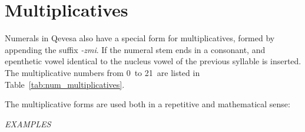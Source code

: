 \documentclass[grammar]{subfiles}
\begin{document}
  \section{Multiplicatives}
  \label{sec:num_multiplicatives}

  Numerals in Qevesa also have a special form for multiplicatives, formed by appending the suffix \textit{-zmi}. If the numeral stem ends in a consonant, and epenthetic vowel identical to the nucleus vowel of the previous syllable is inserted. The multiplicative numbers from 0\dec\ to 21\dec\ are listed in Table~\ref{tab:num_multiplicatives}.

  \begin{table}[htpb]\small\capstart
      \qquad
      \caption{Multiplicative numerals from 0\dec\ to 21\dec\label{tab:num_multiplicatives}}
  \end{table}

  The multiplicative forms are used both in a repetitive and mathematical sense:

  \begin{exe}
    \ex \emph{EXAMPLES}
  \end{exe}
\end{document}
